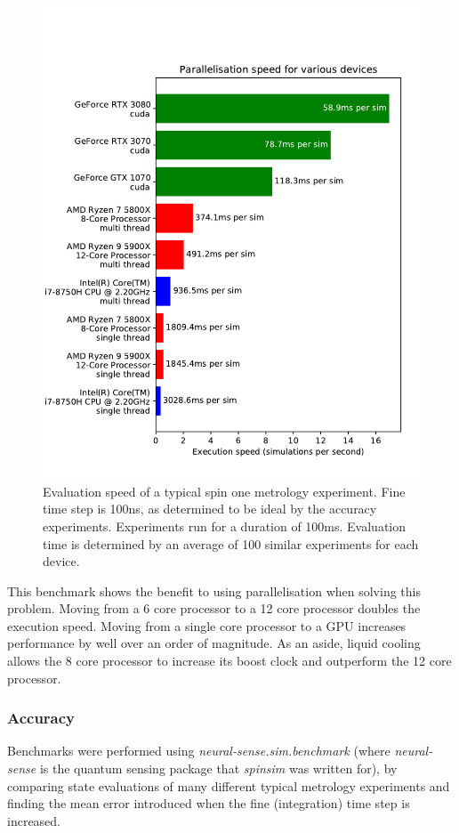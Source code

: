 \documentclass{jors}
\begin{document}
			\begin{figure}[h!]
				\includegraphics[scale=0.9]{benchmark_device_aggregate_publication.pdf}
				\caption{Evaluation speed of a typical spin one metrology experiment. Fine time step is 100ns, as determined to be ideal by the accuracy experiments. Experiments run for a duration of 100ms. Evaluation time is determined by an average of 100 similar experiments for each device.}
				\label{fig:benchmark_device_aggregate}
			\end{figure}

			This benchmark shows the benefit to using parallelisation when solving this problem. Moving from a 6 core processor to a 12 core processor doubles the execution speed. Moving from a single core processor to a GPU increases performance by well over an order of magnitude. As an aside, liquid cooling allows the 8 core processor to increase its boost clock and outperform the 12 core processor.

		\subsubsection*{Accuracy}
			Benchmarks were performed using \emph{neural-sense.sim.benchmark} (where \emph{neural-sense} \cite{alexander-tritt-monash_alexander-tritt-monashneural-sense_2020} is the quantum sensing package that \emph{spinsim} was written for), by comparing state evaluations of many different typical metrology experiments and finding the mean error introduced when the fine (integration) time step is increased.\\
\end{document}

